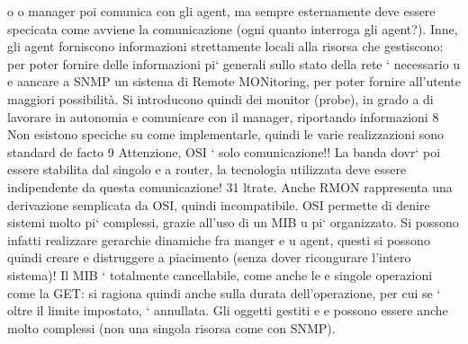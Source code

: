 \documentclass[a4paper,12pt]{article}
\begin{document}
o
o
manager poi comunica con gli agent, ma sempre esternamente deve essere specicata come avviene la comunicazione (ogni
quanto interroga gli agent?). Inne,
gli agent forniscono informazioni strettamente locali alla risorsa che gestiscono:
per poter fornire delle informazioni pi` generali sullo stato della rete ` necessario
u
e
aancare a SNMP un sistema di Remote MONitoring, per poter fornire all'utente maggiori possibilità. Si introducono quindi
dei monitor (probe), in grado
a
di lavorare in autonomia e comunicare con il manager, riportando informazioni
8 Non esistono speciche su come implementarle, quindi le varie realizzazioni sono standard
de facto
9 Attenzione, OSI ` solo comunicazione!! La banda dovr` poi essere stabilita dal singolo
e
a
router, la tecnologia utilizzata deve essere indipendente da questa comunicazione!
31
ltrate. Anche RMON rappresenta una derivazione semplicata da OSI, quindi
incompatibile.
OSI permette di denire sistemi molto pi` complessi, grazie all'uso di un MIB
u
pi` organizzato. Si possono infatti realizzare gerarchie dinamiche fra manger e
u
agent, questi si possono quindi creare e distruggere a piacimento (senza dover
ricongurare l'intero sistema)! Il MIB ` totalmente cancellabile, come anche le
e
singole operazioni come la GET: si ragiona quindi anche sulla durata dell'operazione, per cui se ` oltre il limite
impostato, ` annullata. Gli oggetti gestiti
e
e
possono essere anche molto complessi (non una singola risorsa come con SNMP).
\end{document}
